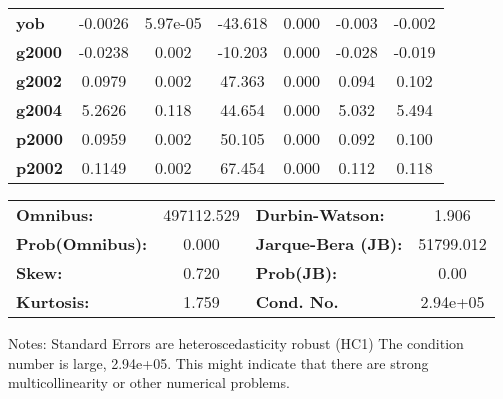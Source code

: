\begin{center}
\begin{tabular}{lcccccc}
\textbf{yob}                   &      -0.0026  &     5.97e-05     &   -43.618  &         0.000        &       -0.003    &       -0.002     \\
\textbf{g2000}                 &      -0.0238  &        0.002     &   -10.203  &         0.000        &       -0.028    &       -0.019     \\
\textbf{g2002}                 &       0.0979  &        0.002     &    47.363  &         0.000        &        0.094    &        0.102     \\
\textbf{g2004}                 &       5.2626  &        0.118     &    44.654  &         0.000        &        5.032    &        5.494     \\
\textbf{p2000}                 &       0.0959  &        0.002     &    50.105  &         0.000        &        0.092    &        0.100     \\
\textbf{p2002}                 &       0.1149  &        0.002     &    67.454  &         0.000        &        0.112    &        0.118     \\
\bottomrule
\end{tabular}
\begin{tabular}{lclc}
\textbf{Omnibus:}       & 497112.529 & \textbf{  Durbin-Watson:     } &     1.906  \\
\textbf{Prob(Omnibus):} &    0.000   & \textbf{  Jarque-Bera (JB):  } & 51799.012  \\
\textbf{Skew:}          &    0.720   & \textbf{  Prob(JB):          } &      0.00  \\
\textbf{Kurtosis:}      &    1.759   & \textbf{  Cond. No.          } &  2.94e+05  \\
\bottomrule
\end{tabular}
\end{center}

Notes: \newline
 [1] Standard Errors are heteroscedasticity robust (HC1) \newline
 [2] The condition number is large, 2.94e+05. This might indicate that there are \newline
 strong multicollinearity or other numerical problems.